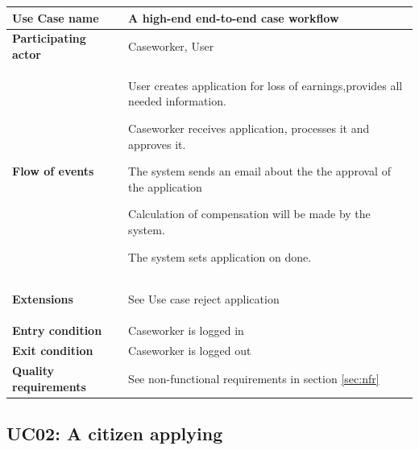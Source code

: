 \begin{table}[htb!]
\begin{tabularx}{\textwidth}{l|X}
	\textbf{Use Case name} & A high-end end-to-end case workflow \\
	\hline
	\textbf{Participating actor} & Caseworker, User\\
	\hline
	\textbf{Flow of events} &
	\vspace{-2mm}
	\begin{compactenum}
			\item User creates application for loss of earnings,provides all needed information.
			\item Caseworker receives application, processes it and approves it.
			\item The system sends an email about the the approval of the application
			\item Calculation of compensation will be made by the system.
			\item The system sets application on done.
	\end{compactenum}\\
	\hline
	\textbf{Extensions} & 
		\vspace{-2mm}
	    \begin{compactenum}
	        \setcounter{enumi}{1}
	        \item See Use case reject application
	    \end{compactenum}\\
	\hline
	\textbf{Entry condition} &
	Caseworker is logged in
	\\
	\hline
	\textbf{Exit condition} & Caseworker is logged out\\
	\hline
	\textbf{Quality requirements} & See non-functional requirements in section \ref{sec:nfr}\\
\end{tabularx}
\end{table}

\subsection{UC02: A citizen applying}


